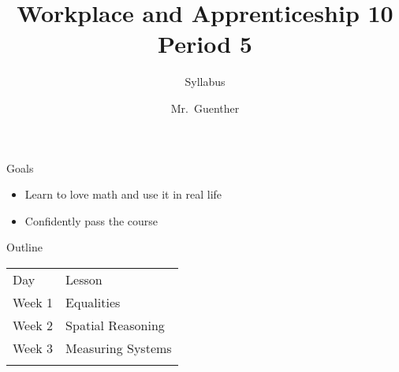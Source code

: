\documentclass[ignorenonframetext,]{beamer}
\title{Workplace and Apprenticeship 10 Period 5}
\author{Syllabus}
\date{Mr.~Guenther}
\begin{document}
\frame{\titlepage}

\begin{frame}{Goals}

\begin{itemize}
\itemsep1pt\parskip0pt
\item
  Learn to love math and use it in real life
\item
  Confidently pass the course
\end{itemize}

\end{frame}

\begin{frame}{Outline}

\begin{longtable}[c]{@{}ll@{}}
\toprule\addlinespace
Day & Lesson
\\\addlinespace
\midrule\endhead
Week 1 & Equalities
\\\addlinespace
Week 2 & Spatial Reasoning
\\\addlinespace
Week 3 & Measuring Systems
\\\addlinespace
\bottomrule
\end{longtable}

\end{frame}
\end{document}
